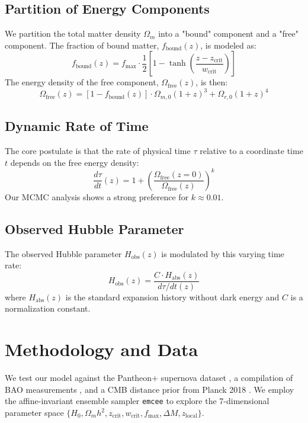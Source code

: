 \documentclass[12pt, a4paper]{article}
\begin{document}
\subsection{Partition of Energy Components}
We partition the total matter density $\Omega_m$ into a "bound" component and a "free" component. The fraction of bound matter, $f_{\text{bound}}(z)$, is modeled as:
\begin{equation}
f_{\text{bound}}(z) = f_{\max} \cdot \frac{1}{2} \left[1 - \tanh\left(\frac{z - z_{\text{crit}}}{w_{\text{crit}}}\right)\right]
\end{equation}
The energy density of the free component, $\Omega_{\text{free}}(z)$, is then:
\begin{equation}
\Omega_{\text{free}}(z) = [1 - f_{\text{bound}}(z)] \cdot \Omega_{m,0} (1+z)^3 + \Omega_{r,0} (1+z)^4
\end{equation}

\subsection{Dynamic Rate of Time}
The core postulate is that the rate of physical time $\tau$ relative to a coordinate time $t$ depends on the free energy density:
\begin{equation}
\frac{d\tau}{dt}(z) = 1 + \left( \frac{\Omega_{\text{free}}(z=0)}{\Omega_{\text{free}}(z)} \right)^k
\end{equation}
Our MCMC analysis shows a strong preference for $k \approx 0.01$.

\subsection{Observed Hubble Parameter}
The observed Hubble parameter $H_{\text{obs}}(z)$ is modulated by this varying time rate:
\begin{equation}
H_{\text{obs}}(z) = \frac{C \cdot H_{\text{abs}}(z)}{d\tau/dt(z)}
\end{equation}
where $H_{\text{abs}}(z)$ is the standard expansion history without dark energy and $C$ is a normalization constant.

\section{Methodology and Data}
We test our model against the Pantheon+ supernova dataset \cite{PantheonPlus}, a compilation of BAO measurements \cite{BAO_compilation}, and a CMB distance prior from Planck 2018 \cite{Planck2018}. We employ the affine-invariant ensemble sampler \texttt{emcee} \cite{emcee} to explore the 7-dimensional parameter space $\{H_0, \Omega_m h^2, z_{\text{crit}}, w_{\text{crit}}, f_{\max}, \Delta M, z_{\text{local}}\}$.
\end{document}
